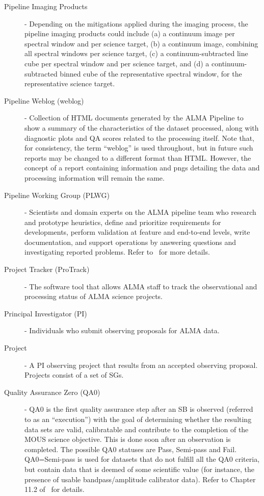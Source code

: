 \begin{description}
\item[Pipeline Imaging Products] - Depending on the mitigations applied during the imaging process, the pipeline imaging products could include 
(a) a continuum image per spectral window and per science target,
(b) a continuum image, combining all spectral windows per science target,
(c) a continuum-subtracted line cube per spectral window and per science target, and
(d) a continuum-subtracted binned cube of the representative spectral window, for the representative science target.
\item[Pipeline Weblog (weblog)] - Collection of HTML documents generated by the ALMA Pipeline to show a summary of the characteristics of the dataset processed, along with diagnostic plots and QA scores related to the processing itself. Note that, for consistency, the term ``weblog'' is used throughout, but in future such reports may be changed to a different format than HTML. However, the concept of a report containing information and pngs detailing the data and processing information will remain the same.
\item[Pipeline Working Group (PLWG)] - Scientists and domain experts on the ALMA pipeline team who research and prototype heuristics, define and prioritize requirements for developments, perform validation at feature and end-to-end levels, write documentation, and support operations by answering questions and investigating reported problems. Refer to~\cite{dp,dpda} for more details. 
\item[Project Tracker (ProTrack)] - The software tool that allows ALMA staff to track the observational and processing status of ALMA science projects.
\item[Principal Investigator (PI)] - Individuals who submit observing proposals for ALMA data.
\item[Project] - A PI observing project that results from an accepted observing proposal. Projects consist of a set of SGs.
\item[Quality Assurance Zero (QA0)] - QA0 is the first quality assurance step after an SB is observed (referred to as an ``execution'') with the goal of determining whether the resulting data sets are valid, calibratable and contribute to the completion of the MOUS science objective. This is done soon after an observation is completed. The possible QA0 statuses are Pass, Semi-pass and Fail. QA0=Semi-pass is used for datasets that do not fulfill all the QA0 criteria, but contain data that is deemed of some scientific value (for instance, the presence of usable bandpass/amplitude calibrator data). Refer to Chapter 11.2 of~\cite{c10_thb} for details.

\end{description}
